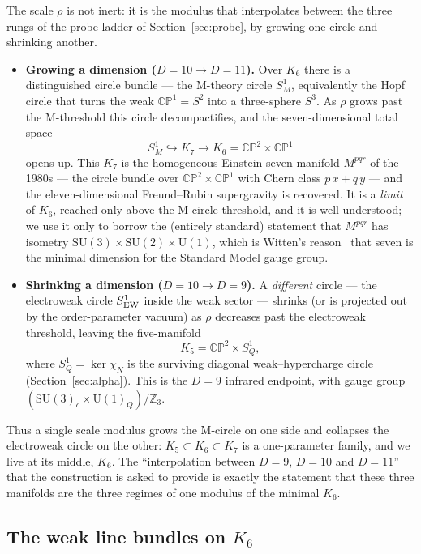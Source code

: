 \documentclass[11pt]{article}
\theoremstyle{plain}
\theoremstyle{definition}
\newcommand{\Z}{\mathbb{Z}}
\newcommand{\SU}{\mathrm{SU}}
\newcommand{\U}{\mathrm{U}}
\begin{document}
The scale $\rho$ is not inert: it is the modulus that interpolates
between the three rungs of the probe ladder of Section~\ref{sec:probe}, by
growing one circle and shrinking another.
\begin{itemize}
\item \textbf{Growing a dimension ($D=10\to D=11$).} Over $K_6$ there is a
distinguished circle bundle --- the M-theory circle $S^1_M$, equivalently the
Hopf circle that turns the weak $\mathbb{CP}^1=S^2$ into a three-sphere $S^3$.
As $\rho$ grows past the M-threshold this circle decompactifies, and the
seven-dimensional total space
\begin{equation}
S^1_M\hookrightarrow K_7\longrightarrow K_6=\mathbb{CP}^2\times\mathbb{CP}^1
\end{equation}
opens up. This $K_7$ is the homogeneous Einstein seven-manifold $M^{pqr}$ of
the 1980s --- the circle bundle over $\mathbb{CP}^2\times\mathbb{CP}^1$ with
Chern class $p\,x+q\,y$ --- and the eleven-dimensional Freund--Rubin
supergravity is recovered. It is a \emph{limit} of $K_6$, reached only above
the M-circle threshold, and it is well understood; we use it only to borrow
the (entirely standard) statement that $M^{pqr}$ has isometry
$\SU(3)\times\SU(2)\times\U(1)$, which is Witten's reason~\cite{Witten1981}
that seven is the minimal dimension for the Standard Model gauge group.
\item \textbf{Shrinking a dimension ($D=10\to D=9$).} A \emph{different}
circle --- the electroweak circle $S^1_{\rm EW}$ inside the weak sector ---
shrinks (or is projected out by the order-parameter vacuum) as $\rho$
decreases past the electroweak threshold, leaving the five-manifold
\begin{equation}
K_5=\mathbb{CP}^2\times S^1_Q,
\end{equation}
where $S^1_Q=\ker\chi_N$ is the surviving diagonal weak--hypercharge circle
(Section~\ref{sec:alpha}). This is the $D=9$ infrared endpoint, with gauge
group $(\SU(3)_c\times\U(1)_Q)/\Z_3$.
\end{itemize}
Thus a single scale modulus grows the M-circle on one side and collapses the
electroweak circle on the other: $K_5\subset K_6\subset K_7$ is a
one-parameter family, and we live at its middle, $K_6$. The ``interpolation
between $D=9$, $D=10$ and $D=11$'' that the construction is asked to provide
is exactly the statement that these three manifolds are the three regimes of
one modulus of the minimal $K_6$.

\subsection{The weak line bundles on $K_6$}
\end{document}
